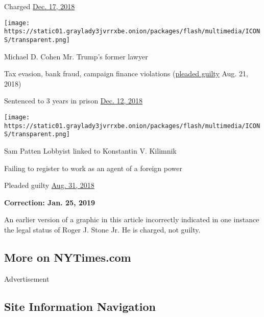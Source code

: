 Charged
\href{https://www.nytimes3xbfgragh.onion/2018/12/17/us/politics/flynn-turkey-bijan-kian.html}{Dec.
17, 2018}

\texttt{[image: https://static01.graylady3jvrrxbe.onion/packages/flash/multimedia/ICONS/transparent.png]}

Michael D. Cohen Mr. Trump's former lawyer

Tax evasion, bank fraud, campaign finance violations
(\href{https://www.nytimes3xbfgragh.onion/2018/08/21/nyregion/michael-cohen-plea-deal-trump.html}{pleaded
guilty} Aug. 21, 2018)

Sentenced to 3 years in prison
\href{https://www.nytimes3xbfgragh.onion/2018/12/12/nyregion/michael-cohen-sentence-trump.html}{Dec.
12, 2018}

\texttt{[image: https://static01.graylady3jvrrxbe.onion/packages/flash/multimedia/ICONS/transparent.png]}

Sam Patten Lobbyist linked to Konstantin V. Kilimnik

Failing to register to work as an agent of a foreign power

Pleaded guilty
\href{https://www.nytimes3xbfgragh.onion/2018/08/31/us/politics/patten-fara-manafort.html}{Aug.
31, 2018}

\textbf{Correction: Jan. 25, 2019}

An earlier version of a graphic in this article incorrectly indicated in
one instance the legal status of Roger J. Stone Jr. He is charged, not
guilty.

\hypertarget{more-on-nytimescom}{%
\subsection{More on NYTimes.com}\label{more-on-nytimescom}}

Advertisement

\hypertarget{site-information-navigation}{%
\subsection{Site Information
Navigation}\label{site-information-navigation}}

